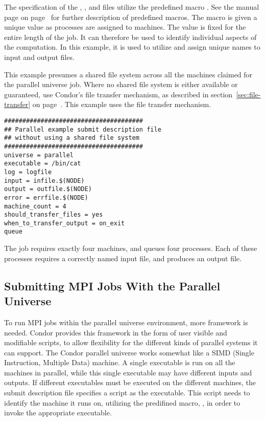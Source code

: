 The specification of the , ,
and  files utilize the predefined macro 
.
See the 
manual page on page~\pageref{man-condor-submit} for further
description of predefined macros.
The  macro is given a
unique value as processes are assigned to machines.
The  value is fixed for the entire length of the job.
It can therefore be used to identify individual aspects of the computation.
In this example, it is used to utilize and assign unique names to
input and output files.

This example presumes a shared file system across all the machines
claimed for the parallel universe job. 
Where no shared file system is either available or guaranteed,
use Condor's file transfer mechanism,
as described in section~\ref{sec:file-transfer}
on page~\pageref{sec:file-transfer}.
This example uses the file transfer mechanism.

\begin{verbatim}
######################################
## Parallel example submit description file
## without using a shared file system
######################################
universe = parallel
executable = /bin/cat
log = logfile
input = infile.$(NODE)
output = outfile.$(NODE)
error = errfile.$(NODE)
machine_count = 4
should_transfer_files = yes
when_to_transfer_output = on_exit
queue
\end{verbatim}

The job requires exactly four machines,
and queues four processes.
Each of these processes requires a correctly named input file,
and produces an output file.

\subsection{\label{sec:parallel-mpi-submit}Submitting MPI Jobs With the Parallel Universe}

To run MPI jobs within the parallel universe environment,
more framework is needed.
Condor provides this
framework in the form of user visible and modifiable scripts, to allow
flexibility for the different kinds of parallel systems it can support.
The Condor parallel universe works somewhat like a SIMD
(Single Instruction, Multiple Data) machine.
A single
executable is run on all the machines in parallel, while this single
executable may have different inputs and outputs.  
If different
executables must be executed on the different machines,
the submit description file specifies a script as
the executable.
This script needs to identify the machine it runs on,
utilizing the predifined macro, ,
in order to invoke the appropriate executable.

